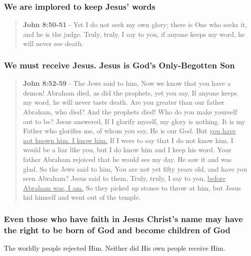 \documentclass[11pt]{article}
\begin{document}
\subsubsection{We are implored to keep Jesus' words}
\label{sec:org760f4df}
\begin{quote}
\textbf{John 8:50-51} - Yet I do not seek my own glory; there is One who seeks it, and he is the judge. Truly, truly, I say to you, if anyone keeps my word, he will never see death.
\end{quote}

\subsubsection{We must receive Jesus. Jesus is God's Only-Begotten Son}
\label{sec:org4406b1c}
\begin{quote}
\textbf{John 8:52-59} - The Jews said to him, Now we know that you have a demon! Abraham died, as did the prophets, yet you say, If anyone keeps my word, he will never taste death. Are you greater than our father Abraham, who died? And the prophets died! Who do you make yourself out to be? Jesus answered, If I glorify myself, my glory is nothing. It is my Father who glorifies me, of whom you say, He is our God. But \uline{you have not known him. I know him.} If I were to say that I do not know him, I would be a liar like you, but I do know him and I keep his word. Your father Abraham rejoiced that he would see my day. He saw it and was glad. So the Jews said to him, You are not yet fifty years old, and have you seen Abraham? Jesus said to them, Truly, truly, I say to you, \uline{before Abraham was, I am.} So they picked up stones to throw at him, but Jesus hid himself and went out of the temple.
\end{quote}

\subsubsection{Even those who have faith in Jesus Christ's name may have the right to be born of God and become children of God}
\label{sec:org46da246}
The worldly people rejected Him. Neither did His own people receive Him.
\end{document}
